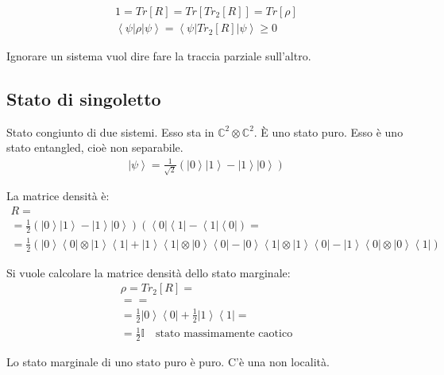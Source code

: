 \begin{equation}\begin{split}
1=Tr\left[R\right]=Tr\left[Tr_2\left[R\right]\right]=Tr\left[\rho\right] \\
\left\langle \psi |\rho |\psi  \right\rangle=\left\langle \psi |Tr_2\left[R\right] | \psi  \right\rangle \ge 0
\end{split}\end{equation}

Ignorare un sistema vuol dire fare la traccia parziale sull'altro.

\subsection{Stato di singoletto} %
Stato congiunto di due sistemi. Esso sta in $\mathbb{C} ^2\otimes \mathbb{C} ^2$. È uno stato puro. Esso è uno stato entangled, cioè non separabile.
\begin{equation}\begin{split}
\left |\psi  \right\rangle=\frac{1}{\sqrt{2}}\left(\left |0 \right\rangle\left |1 \right\rangle-\left |1 \right\rangle\left |0 \right\rangle\right)
\end{split}\end{equation}

La matrice densità è:
\begin{equation}\begin{split}
R=\\
=\frac{1}{2}\left(\left |0 \right\rangle\left |1 \right\rangle - \left |1 \right\rangle\left |0 \right\rangle\right)\left(\left\langle 0\right |\left\langle 1\right |-\left\langle 1\right |\left\langle 0\right |\right)=\\
=\frac{1}{2}\left(\left |0 \right\rangle\left\langle 0\right |\otimes \left |1 \right\rangle\left\langle 1\right |+ \left |1 \right\rangle\left\langle 1\right |\otimes \left |0 \right\rangle\left\langle 0\right | - \left |0 \right\rangle\left\langle 1\right |\otimes \left |1 \right\rangle\left\langle 0\right | -\left |1 \right\rangle\left\langle 0\right | \otimes \left |0 \right\rangle\left\langle 1\right |\right)
\end{split}\end{equation}

Si vuole calcolare la matrice densità dello stato marginale:
\begin{equation}\begin{split}
\rho=Tr_2\left[R\right]=\\
= =\\
=\frac{1}{2}\left |0 \right\rangle\left\langle 0\right |+\frac{1}{2}\left |1 \right\rangle\left\langle 1\right |=\\
=\frac{1}{2}\mathbb{I} \quad \textrm{stato massimamente caotico}
\end{split}\end{equation}

Lo stato marginale di uno stato puro è puro. C'è una non località.

